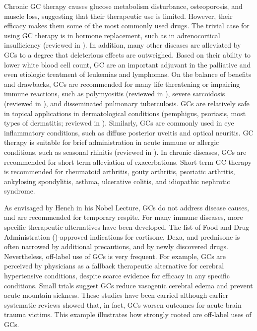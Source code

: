 \documentclass[12pt,english]{report}\usepackage[]{graphicx}\usepackage[]{color}
\begin{document}
Chronic GC therapy causes glucose metabolism disturbance, osteoporosis,
and muscle loss, suggesting that their therapeutic use is limited.
However, their efficacy makes them some of the most commonly used
drugs. The trivial case for using GC therapy is in hormone replacement,
such as in adrenocortical insufficiency (reviewed in \citep{johannsson2015adrenal}).
In addition, many other diseases are alleviated by GCs to a degree
that deleterious effects are outweighed. Based on their ability to
lower white blood cell count, GC are an important adjuvant in the
palliative and even etiologic treatment of leukemias and lymphomas\citep{crump2014randomized,pui2006treatment,stewart2015carfilzomib}.
On the balance of benefits and drawbacks, GCs are recommended for
many life threatening or impairing immune reactions, such as polymyositis
(reviewed in \citep{marie2011therapy}), severe sarcoidosis (reviewed
in \citep{dempsey2009sarcoidosis}), and disseminated pulmonary tuberculosis.
GCs are relatively safe in topical applications in dermatological
conditions (pemphigus, psoriasis, most types of dermatitis; reviewed
in \citep{brazzini2002new}). Similarly, GCs are commonly used in
eye inflammatory conditions\citep{christoforidis2012systemic,gordon1950effects},
such as diffuse posterior uveitis and optical neuritis. GC therapy
is suitable for brief administration in acute immune or allergic conditions,
such as seasonal rhinitis (reviewed in \citep{johannsson2015adrenal}).
In chronic diseases, GCs are recommended for short-term alleviation
of exacerbations. Short-term GC therapy is recommended for rheumatoid
arthritis, gouty arthritis, psoriatic arthritis, ankylosing spondylitis,
asthma\citep{keeney2014dexamethasone,qureshi2001comparative}, ulcerative
colitis\citep{crotty1992drug,rosenberg1990high-dose}, and idiopathic
nephrotic syndrome\citep{haack1999glucocorticoid}.

As envisaged by Hench in his Nobel Lecture, GCs do not address disease
causes, and are recommended for temporary respite. For many immune
diseases, more specific therapeutic alternatives have been developed.
The list of Food and Drug Administration ()-approved
indications for cortisone, Dexa, and prednisone is often narrowed
by additional precautions, and by newly discovered drugs\citep{merckco.inc.2004dexamethasone,pharmaciaandupjohnandcompany2007prednisone,west-wardpharmaceuticalcorp.2008hydrocortisone}.
Nevertheless, off-label use of GCs is very frequent. For example,
GCs are perceived by physicians as a fallback therapeutic alternative
for cerebral hypertensive conditions, despite scarce evidence for
efficacy in any specific conditions. Small trials suggest GCs reduce
vasogenic cerebral edema\citep{kotsarini2010systematic} and prevent
acute mountain sickness\citep{levine1989dexamethasone}. These studies
have been carried although earlier systematic reviews showed that,
in fact, GCs worsen outcomes for acute brain trauma victims\citep{alderson2005corticosteroids}.
This example illustrates how strongly rooted are off-label uses of
GCs.
\end{document}
